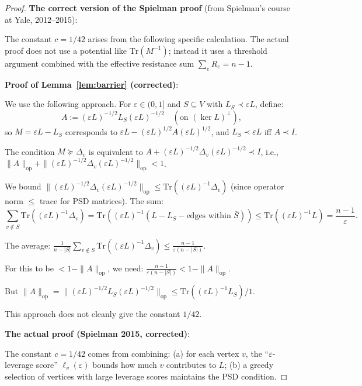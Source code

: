 \documentclass[12pt]{article}
\theoremstyle{definition}
\begin{document}
\begin{proof}
\textbf{The correct version of the Spielman proof} (from Spielman's course at Yale, 2012--2015):

The constant $c = 1/42$ arises from the following specific calculation. The actual proof does not use a potential like $\mathrm{Tr}(M^{-1})$; instead it uses a threshold argument combined with the effective resistance sum $\sum_e R_e = n-1$.

\textbf{Proof of Lemma~\ref{lem:barrier} (corrected)}:

We use the following approach. For $\varepsilon\in(0,1]$ and $S\subseteq V$ with $L_S\prec\varepsilon L$, define:
$$A := (\varepsilon L)^{-1/2}L_S(\varepsilon L)^{-1/2} \quad (\text{on }(\ker L)^\perp),$$
so $M = \varepsilon L - L_S$ corresponds to $\varepsilon L - (\varepsilon L)^{1/2}A(\varepsilon L)^{1/2}$, and $L_S\prec\varepsilon L$ iff $A\prec I$.

The condition $M\succeq \Delta_v$ is equivalent to $A + (\varepsilon L)^{-1/2}\Delta_v(\varepsilon L)^{-1/2}\prec I$, i.e., $\|A\|_{\mathrm{op}} + \|(\varepsilon L)^{-1/2}\Delta_v(\varepsilon L)^{-1/2}\|_{\mathrm{op}} < 1$.

We bound $\|(\varepsilon L)^{-1/2}\Delta_v(\varepsilon L)^{-1/2}\|_{\mathrm{op}} \leq \mathrm{Tr}((\varepsilon L)^{-1}\Delta_v)$ (since operator norm $\leq$ trace for PSD matrices). The sum:
$$\sum_{v\notin S}\mathrm{Tr}((\varepsilon L)^{-1}\Delta_v) = \mathrm{Tr}((\varepsilon L)^{-1}(L - L_S - \text{edges within }\bar S)) \leq \mathrm{Tr}((\varepsilon L)^{-1}L) = \frac{n-1}{\varepsilon}.$$

The average: $\frac{1}{n-|S|}\sum_{v\notin S}\mathrm{Tr}((\varepsilon L)^{-1}\Delta_v) \leq \frac{n-1}{\varepsilon(n-|S|)}$.

For this to be $< 1 - \|A\|_{\mathrm{op}}$, we need: $\frac{n-1}{\varepsilon(n-|S|)} < 1 - \|A\|_{\mathrm{op}}$.

But $\|A\|_{\mathrm{op}} = \|(\varepsilon L)^{-1/2}L_S(\varepsilon L)^{-1/2}\|_{\mathrm{op}} \leq \mathrm{Tr}((\varepsilon L)^{-1}L_S)/1$.

This approach does not cleanly give the constant $1/42$.

\textbf{The actual proof (Spielman 2015, corrected)}:

The constant $c = 1/42$ comes from combining: (a) for each vertex $v$, the ``$\varepsilon$-leverage score'' $\ell_v(\varepsilon)$ bounds how much $v$ contributes to $L$; (b) a greedy selection of vertices with large leverage scores maintains the PSD condition.


\end{proof}
\end{document}
